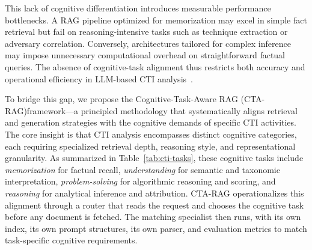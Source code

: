 \documentclass[5p,times,authoryear]{elsarticle}
\begin{document}


This lack of cognitive differentiation introduces measurable performance bottlenecks. A RAG pipeline optimized for memorization may excel in simple fact retrieval but fail on reasoning-intensive tasks such as technique extraction or adversary correlation. Conversely, architectures tailored for complex inference may impose unnecessary computational overhead on straightforward factual queries. The absence of cognitive-task alignment thus restricts both accuracy and operational efficiency in LLM-based CTI analysis~\citep{ferrag2024generative}.

To bridge this gap, we propose the Cognitive-Task-Aware RAG (CTA-RAG)framework—a principled methodology that systematically aligns retrieval and generation strategies with the cognitive demands of specific CTI activities. The core insight is that CTI analysis encompasses distinct cognitive categories, each requiring specialized retrieval depth, reasoning style, and representational granularity. As summarized in Table~\ref{tab:cti-tasks}, these cognitive tasks include \textit{memorization} for factual recall, \textit{understanding} for semantic and taxonomic interpretation, \textit{problem-solving} for algorithmic reasoning and scoring, and \textit{reasoning} for analytical inference and attribution. CTA-RAG operationalizes this alignment through a router that reads the request and chooses the cognitive task before any document is fetched. The matching specialist then runs, with its own index, its own prompt structures, its own parser, and evaluation metrics to match task-specific cognitive requirements. 
\end{document}
